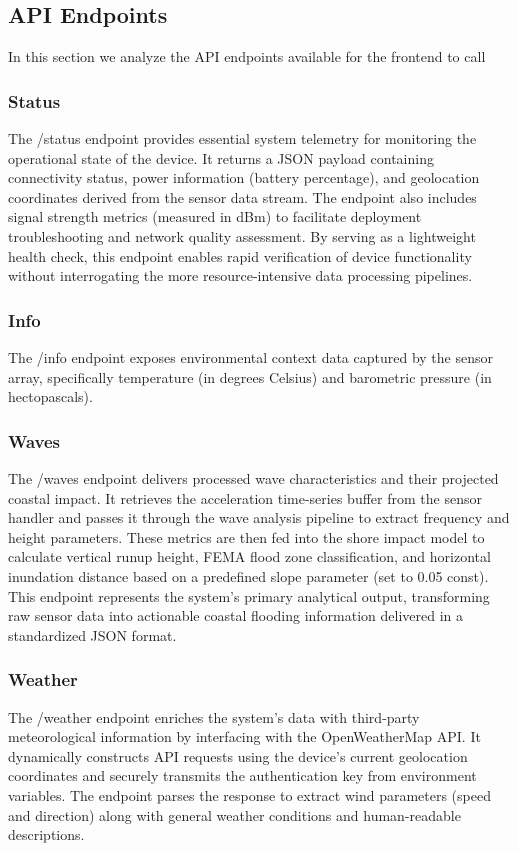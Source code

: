 \documentclass{article}
\begin{document}
\subsection{API Endpoints}
In this section we analyze the API endpoints available for the frontend to call

    \subsubsection{Status}
    The /status endpoint provides essential system telemetry for monitoring the operational state of the device. It returns a JSON payload containing connectivity status, power information (battery percentage), and geolocation coordinates derived from the sensor data stream. The endpoint also includes signal strength metrics (measured in dBm) to facilitate deployment troubleshooting and network quality assessment. By serving as a lightweight health check, this endpoint enables rapid verification of device functionality without interrogating the more resource-intensive data processing pipelines.

    \subsubsection{Info}
    The /info endpoint exposes environmental context data captured by the sensor array, specifically temperature (in degrees Celsius) and barometric pressure (in hectopascals).

    \subsubsection{Waves}
    The /waves endpoint delivers processed wave characteristics and their projected coastal impact. It retrieves the acceleration time-series buffer from the sensor handler and passes it through the wave analysis pipeline to extract frequency and height parameters. These metrics are then fed into the shore impact model to calculate vertical runup height, FEMA flood zone classification, and horizontal inundation distance based on a predefined slope parameter (set to 0.05 const). This endpoint represents the system's primary analytical output, transforming raw sensor data into actionable coastal flooding information delivered in a standardized JSON format.

    \subsubsection{Weather}
    The /weather endpoint enriches the system's data with third-party meteorological information by interfacing with the OpenWeatherMap API. It dynamically constructs API requests using the device's current geolocation coordinates and securely transmits the authentication key from environment variables. The endpoint parses the response to extract wind parameters (speed and direction) along with general weather conditions and human-readable descriptions.
\end{document}
